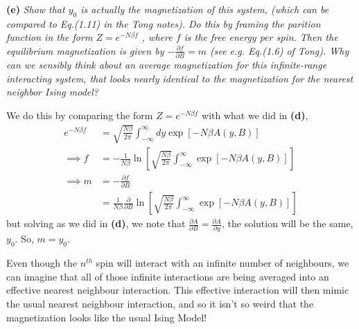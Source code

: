 \documentclass[10pt]{article}
\begin{document}
\textbf{(e)} \textit{Show that $y_{0}$ is actually the magnetization of this system, (which can be compared to Eq.(1.11) in the Tong notes). Do this by framing the parition function in the form $Z = e^{-N\beta f}$ , where $f$ is the free energy per spin. Then the equilibrium magnetization is given by $-\frac{\partial f}{\partial B} = m$ (see e.g. Eq.(1.6) of Tong). Why can we sensibly think about an average magnetization for this infinite-range interacting system, that looks nearly identical to the magnetization for the nearest neighbor Ising model?}

We do this by comparing the form $Z = e^{-N\beta f}$ with what we did in \textbf{(d)},
\begin{align*}
  e^{-N\beta f} & = \sqrt{\frac{N\beta}{2\pi}}\int_{-\infty}^{\infty}dy\exp\left[-N\beta A(y,B)\right] \\
  \implies f & = -\frac{1}{N\beta}\ln\left[\sqrt{\frac{N\beta}{2\pi}}\int_{-\infty}^{\infty}\exp\left[-N\beta A(y,B)\right]\right] \\
  \implies m & = -\frac{\partial f}{\partial B} \\
  & = \frac{1}{N\beta}\frac{\partial}{\partial B}\ln\left[\sqrt{\frac{N\beta}{2\pi}}\int_{-\infty}^{\infty}\exp\left[-N\beta A(y,B)\right]\right]
\end{align*}
but solving as we did in \textbf{(d)}, we note that $\frac{\partial A}{\partial B} = \frac{\partial A}{\partial y}$, the solution will be the same, $y_{0}$. So, $m = y_{0}$.

Even though the $n^{th}$ spin will interact with an infinite number of neighbours, we can imagine that all of those infinite interactions are being averaged into an effective nearest neighbour interaction. This effective interaction will then mimic the usual nearest neighbour interaction, and so  it isn't so weird that the magnetization looks like the usual Ising Model! 
\end{document}
